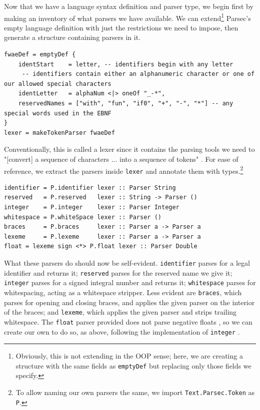 \documentclass[format=acmlarge, review=false, nonacm=false, screen=true]{acmart}
\begin{document}
Now that we have a language syntax definition and parser type, we begin first by making an inventory of what parsers we have available. We can extend\footnote{Obviously, this is not extending in the OOP sense; here, we are creating a structure with the same fields as \texttt{emptyDef} but replacing only those fields we specify.} Parsec's empty language definition with just the restrictions we need to impose, then generate a structure containing parsers in it.

\begin{verbatim}
fwaeDef = emptyDef {
    identStart    = letter, -- identifiers begin with any letter
     -- identifiers contain either an alphanumeric character or one of our allowed special characters
    identLetter   = alphaNum <|> oneOf "_-*",
    reservedNames = ["with", "fun", "if0", "+", "-", "*"] -- any special words used in the EBNF
}
lexer = makeTokenParser fwaeDef
\end{verbatim}

Conventionally, this is called a lexer since it contains the parsing tools we need to "[convert] a sequence of characters ... into a sequence of tokens" \cite{lexer}. For ease of reference, we extract the parsers inside \texttt{lexer} and annotate them with types.\footnote{To allow naming our own parsers the same, we import \texttt{Text.Parsec.Token} as \texttt{P}.}

\begin{verbatim}
identifier = P.identifier lexer :: Parser String
reserved   = P.reserved   lexer :: String -> Parser ()
integer    = P.integer    lexer :: Parser Integer
whitespace = P.whiteSpace lexer :: Parser ()
braces     = P.braces     lexer :: Parser a -> Parser a
lexeme     = P.lexeme     lexer :: Parser a -> Parser a
float = lexeme sign <*> P.float lexer :: Parser Double
\end{verbatim}

What these parsers do should now be self-evident. \texttt{identifier} parses for a legal identifier and returns it; \texttt{reserved} parses for the reserved name we give it; \texttt{integer} parses for a signed integral number and returns it; \texttt{whitespace} parses for whitespacing, acting as a whitespace stripper. Less evident are \texttt{braces}, which parses for opening and closing braces, and applies the given parser on the interior of the braces; and \texttt{lexeme}, which applies the given parser and strips trailing whitespace. The \texttt{float} parser provided does not parse negative floats \cite{parsec-bug}, so we can create our own to do so, as above, following the implementation of \texttt{integer} \cite{token}.
\end{document}
